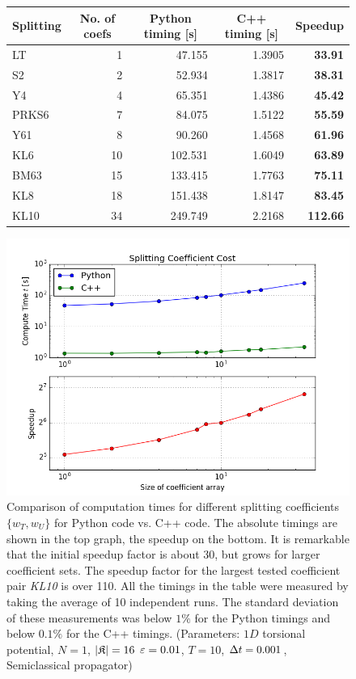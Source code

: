 %
\begin{figure}[ht]
	\centering
	\begin{tabular}{|l | r | r | r | r |} 
		\hline
		\multicolumn{1}{|c}{\textbf{Splitting}} &
		\multicolumn{1}{|c}{\textbf{No. of coefs}} &
		\multicolumn{1}{|c}{\textbf{Python timing [s]}} &
		\multicolumn{1}{|c}{\textbf{C++ timing [s]}} &
		\multicolumn{1}{|c|}{\textbf{Speedup}} \\
		\hline
		LT &1 &47.155 &1.3905 &\textbf{33.91} \\
		S2 &2 &52.934 &1.3817 &\textbf{38.31} \\
		Y4 &4 &65.351 &1.4386 &\textbf{45.42} \\
		PRKS6 &7 &84.075 &1.5122 &\textbf{55.59} \\
		Y61 &8 &90.260 &1.4568 &\textbf{61.96} \\
		KL6 &10 &102.531 &1.6049 &\textbf{63.89} \\
		BM63 &15 &133.415 &1.7763 &\textbf{75.11} \\
		KL8 &18 &151.438 &1.8147 &\textbf{83.45} \\
		KL10 &34 &249.749 &2.2168 &\textbf{112.66} \\
		\hline
	\end{tabular}
	\begin{center}
	\includegraphics[width=.8\textwidth]{figures/coefs.png}
	\end{center}
	\caption{Comparison of computation times for different splitting coefficients $\{ w_T, w_U \}$ for Python code vs. C++ code. The absolute timings are shown in the top graph, the speedup on the bottom. It is remarkable that the initial speedup factor is about 30, but grows for larger coefficient sets. The speedup factor for the largest tested coefficient pair \emph{KL10} is over 110.
	All the timings in the table were measured by taking the average of 10 independent runs. The standard deviation of these measurements was below $1\%$ for the Python timings and below $0.1\%$ for the C++ timings. (Parameters: $1D$ torsional potential, $N=1$, $|\mathfrak{K}|=16$ $\varepsilon=0.01$, $T=10$, $\Delta t=0.001$, Semiclassical propagator)}
	\label{fig:benchmarksplit}
\end{figure}


